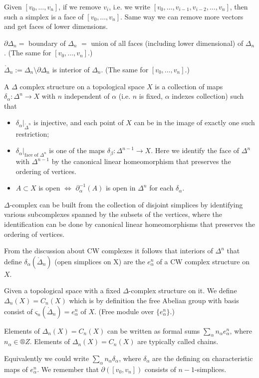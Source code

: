 \documentclass[12pt]{article}					%
\begin{document}
\begin{definice}
	Given $[v_0, …, v_n]$, if we remove $v_i$, i.e. we write $[v_0, …, v_{i-1}, v_{i-2}, …, v_n]$, then such a simplex is a face of $[v_0, …, v_n]$. Same way we can remove more vectors and get faces of lower dimensions.

	$\partial Δ_n =$ boundary of $Δ_n$ $=$ union of all faces (including lower dimensional) of $Δ_n$. (The same for $[v_0, …, v_n]$.)

	$\mathring Δ_n := Δ_n \setminus \partial Δ_n$ is interior of $Δ_n$. (The same for $[v_0, …, v_n]$.)
\end{definice}

\begin{definice}
	A $Δ$ complex structure on a topological space $X$ is a collection of maps $δ_α: Δ^n \rightarrow X$ with $n$ independent of $α$ (i.e. $n$ is fixed, $α$ indexes collection) such that
	\begin{itemize}
		\item $δ_α |_{\mathring Δ^n}$ is injective, and each point of $X$ can be in the image of exactly one such restriction;
		\item $δ_α |_{\text{face of $Δ^n$}}$ is one of the maps $δ_β: Δ^{n - 1} \rightarrow X$. Here we identify the face of $Δ^n$ with $Δ^{n-1}$ by the canonical linear homeomorphism that preserves the ordering of vertices.
		\item $A \subset X$ is open $\Leftrightarrow$ $\partial_α^{-1}(A)$ is open in $Δ^n$ for each $δ_α$.
	\end{itemize}

	\begin{poznamkain}
		$Δ$-complex can be built from the collection of disjoint simplices by identifying various subcomplexes spanned by the subsets of the vertices, where the identification can be done by canonical linear homeomorphisms that preserves the ordering of vertices.

		From the discussion about CW complexes it follows that interiors of $Δ^n$ that define $δ_α(\mathring Δ_n)$ (open simplices on X) are the $e_α^n$ of a CW complex structure on $X$.
	\end{poznamkain}
\end{definice}

\begin{definice}
	Given a topological space with a fixed $Δ$-complex structure on it. We define $Δ_n(X) = C_n(X)$ which is by definition the free Abelian group with basis consist of $ς_n(\mathring Δ_n) = e_α^n$ of $X$. (Free module over $\{e_α^n\}$.)

	\begin{poznamkain}
		Elements of $Δ_n(X) = C_n(X)$ can be written as formal sums $\sum_α n_α e_α^n$, where $n_α \in ®Z$. Elements of $Δ_n(X) = C_n(X)$ are typically called chains.

		Equivalently we could write $\sum_α n_α δ_α$, where $δ_α$ are the defining on characteristic maps of $e_α^n$. We remember that $\partial([v_0, v_n])$ consists of $n-1$-simplices.
	\end{poznamkain}
\end{definice}
\end{document}
